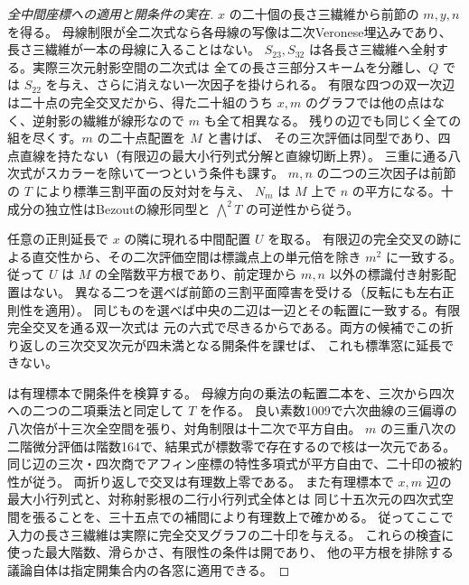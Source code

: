 \begin{proof}[全中間座標への適用と開条件の実在]
$x$ の二十個の長さ三繊維から前節の $m,y,n$ を得る。
母線制限が全二次式なら各母線の写像は二次Veronese埋込みであり、
長さ三繊維が一本の母線に入ることはない。
$S_{23},S_{32}$ は各長さ三繊維へ全射する。実際三次元射影空間の二次式は
全ての長さ三部分スキームを分離し、$Q$ では $S_{22}$ を与え、さらに消えない一次因子を掛けられる。
有限な四つの双一次辺は二十点の完全交叉だから、得た二十組のうち
$x,m$ のグラフでは他の点はなく、逆射影の繊維が線形なので $m$ も全て相異なる。
残りの辺でも同じく全ての組を尽くす。$m$ の二十点配置を $M$ と書けば、
その三次評価は同型であり、四点直線を持たない（有限辺の最大小行列式分解と直線切断上界）。
三重に通る八次式がスカラーを除いて一つという条件も課す。
$m,n$ の二つの三次因子は前節の $T$ により標準三割平面の反対対を与え、
$N_m$ は $M$ 上で $n$ の平方になる。十成分の独立性はBezoutの線形同型と
$\bigwedge^2 T$ の可逆性から従う。

任意の正則延長で $x$ の隣に現れる中間配置 $U$ を取る。
有限辺の完全交叉の跡による直交性から、その二次評価空間は標識点上の単元倍を除き $m^2$ に一致する。
従って $U$ は $M$ の全階数平方根であり、前定理から $m,n$ 以外の標識付き射影配置はない。
異なる二つを選べば前節の三割平面障害を受ける（反転にも左右正則性を適用）。
同じものを選べば中央の二辺は一辺とその転置に一致する。有限完全交叉を通る双一次式は
元の六式で尽きるからである。両方の候補でこの折り返しの三次交叉次元が四未満となる開条件を課せば、
これも標準窓に延長できない。

 は有理標本で開条件を検算する。
母線方向の乗法の転置二本を、三次から四次への二つの二項乗法と同定して $T$ を作る。
良い素数1009で六次曲線の三偏導の八次倍が十三次全空間を張り、対角制限は十二次で平方自由。
$m$ の三重八次の二階微分評価は階数164で、結果式が標数零で存在するので核は一次元である。
同じ辺の三次・四次商でアフィン座標の特性多項式が平方自由で、二十印の被約性が従う。
両折り返しで交叉は有理数上零である。
また有理標本で $x,m$ 辺の最大小行列式と、対称射影根の二行小行列式全体とは
同じ十五次元の四次式空間を張ることを、三十五点での補間により有理数上で確かめる。
従ってここで入力の長さ三繊維は実際に完全交叉グラフの二十印を与える。
これらの検査に使った最大階数、滑らかさ、有限性の条件は開であり、
他の平方根を排除する議論自体は指定開集合内の各窓に適用できる。
\end{proof}
